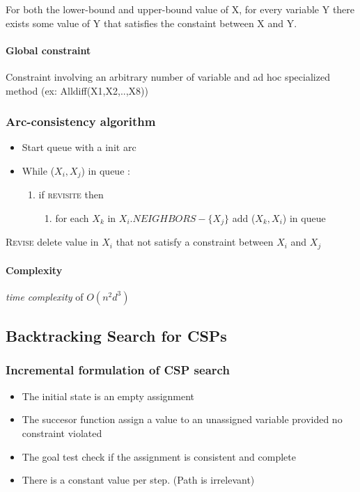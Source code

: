 For both the lower-bound and upper-bound value of X, for every variable Y there
exists some value of Y that satisfies the constaint between X and Y.

\paragraph{Global constraint}  Constraint involving an  arbitrary number
of variable and ad hoc specialized method (ex: Alldiff(X1,X2,..,X8))

\subsubsection{Arc-consistency algorithm}

\begin{itemize}
    \item Start queue with a init arc
    \item While ($X_i, X_j$) in queue :
        \begin{enumerate}
            \item if \textsc{revisite} then
                \begin{enumerate}
                    \item for each $X_k$ in $X_i.NEIGHBORS - \{X_j\}$ add ($X_k, X_i$) in queue
                \end{enumerate}
       \end{enumerate}
\end{itemize}

\textsc{Revise} delete value in $X_i$ that not satisfy a constraint between $X_i$ and $X_j$

\paragraph{Complexity} \textit{time complexity} of $O(n^2 d^3)$

\subsection{Backtracking Search for CSPs}

\subsubsection{Incremental formulation of CSP search }
\begin{itemize}
	\item The initial state is an empty assignment
	\item The succesor function assign a value to an unassigned variable provided no constraint violated
	\item The goal test check if the assignment is consistent and complete
	\item There is a constant value per step. (Path is irrelevant)
\end{itemize}

